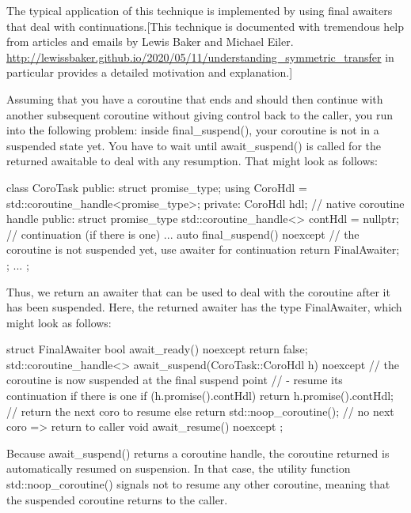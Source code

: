 
The typical application of this technique is implemented by using final awaiters that deal with continuations.[This technique is documented with tremendous help from articles and emails by Lewis Baker and Michael Eiler. \url{http://lewissbaker.github.io/2020/05/11/understanding_symmetric_transfer} in particular provides a detailed motivation and explanation.]

Assuming that you have a coroutine that ends and should then continue with another subsequent coroutine without giving control back to the caller, you run into the following problem: inside final\_suspend(), your coroutine is not in a suspended state yet. You have to wait until await\_suspend() is called for the returned awaitable to deal with any resumption. That might look as follows:

\begin{cpp}
class CoroTask
{
public:
	struct promise_type;
	using CoroHdl = std::coroutine_handle<promise_type>;
private:
	CoroHdl hdl; // native coroutine handle
public:
	struct promise_type {
		std::coroutine_handle<> contHdl = nullptr; // continuation (if there is one)
		...
		auto final_suspend() noexcept {
			// the coroutine is not suspended yet, use awaiter for continuation
			return FinalAwaiter{};
		}
	};
	...
};
\end{cpp}

Thus, we return an awaiter that can be used to deal with the coroutine after it has been suspended. Here, the returned awaiter has the type FinalAwaiter, which might look as follows:

\begin{cpp}
struct FinalAwaiter {
	bool await_ready() noexcept {
		return false;
	}
	std::coroutine_handle<> await_suspend(CoroTask::CoroHdl h) noexcept {
		// the coroutine is now suspended at the final suspend point
		// - resume its continuation if there is one
		if (h.promise().contHdl) {
			return h.promise().contHdl; // return the next coro to resume
		}
		else {
			return std::noop_coroutine(); // no next coro => return to caller
		}
	}
	void await_resume() noexcept {
	}
};
\end{cpp}

Because await\_suspend() returns a coroutine handle, the coroutine returned is automatically resumed on suspension. In that case, the utility function std::noop\_coroutine() signals not to resume any other coroutine, meaning that the suspended coroutine returns to the caller.

